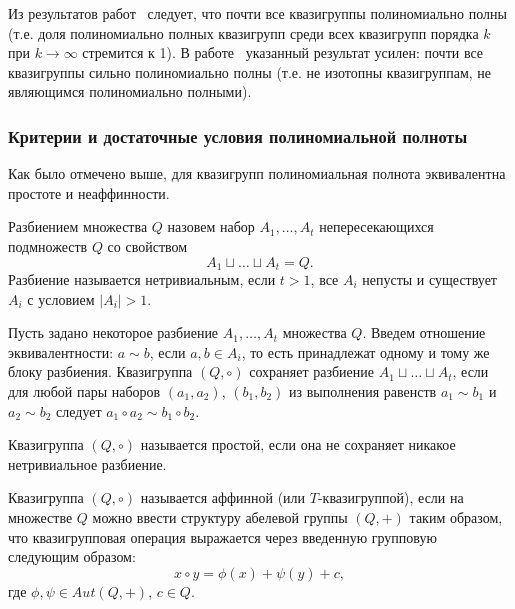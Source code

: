     Из результатов работ~\cite{salomaa63, cameron92} следует, что почти все квазигруппы полиномиально полны (т.е. доля полиномиально полных квазигрупп среди всех квазигрупп порядка $k$ при $k \to \infty$ стремится к 1).
    В работе~\cite{galatenko22} указанный результат усилен: почти все квазигруппы сильно полиномиально полны (т.е. не изотопны квазигруппам, не являющимся полиномиально полными).


\subsubsection{Критерии и достаточные условия полиномиальной полноты}

    Как было отмечено выше, для квазигрупп полиномиальная полнота эквивалентна простоте и неаффинности.

    \begin{definition}
        Разбиением множества $Q$ назовем набор $A_1, \ldots, A_t$ непересекающихся подмножеств $Q$ со свойством
        \[
            A_1 \sqcup \ldots \sqcup A_t = Q.
        \]
        Разбиение называется нетривиальным, если $t > 1$, все $A_i$ непусты и существует $A_i$ с условием $|A_i| > 1$. 
    \end{definition}

    \begin{definition}
        Пусть задано некоторое разбиение $A_1, \ldots, A_t$ множества $Q$.
        Введем отношение эквивалентности: $a \sim b$, если $a, b \in A_i$, то есть принадлежат одному и тому же блоку разбиения.
        Квазигруппа $(Q, \circ)$ сохраняет разбиение $A_1 \sqcup \ldots \sqcup A_t$, если для любой пары наборов $(a_1, a_2)$, $(b_1, b_2)$ из выполнения равенств $a_1 \sim b_1$ и $a_2 \sim b_2$ следует $a_1 \circ a_2 \sim b_1 \circ b_2$. 
    \end{definition}

    \begin{definition}
        Квазигруппа $(Q, \circ)$ называется простой, если она не сохраняет никакое нетривиальное разбиение.
    \end{definition}

    \begin{definition}
        Квазигруппа $(Q, \circ)$ называется аффинной (или $T$-квазигруппой), если на множестве $Q$ можно ввести структуру абелевой группы $(Q, +)$ таким образом, что квазигрупповая операция выражается через введенную групповую следующим образом:
        \[
            x \circ y = \phi(x) + \psi(y) + c,
        \]
        где $\phi, \psi \in Aut(Q, +)$, $c \in Q$.
    \end{definition}

